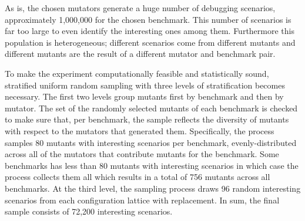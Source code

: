 

As is, the chosen mutators generate a huge number of debugging scenarios,
approximately 1,000,000 for the chosen benchmark. This number of scenarios is
far too large to even identify the interesting ones among them.  Furthermore
this population is heterogeneous; different scenarios come from different
mutants and different mutants are the result of a different mutator and
benchmark pair.

To make the experiment computationally feasible and statistically sound,
stratified uniform random sampling with three levels of stratification becomes
necessary.  The first two levels group mutants first by benchmark and then by
mutator.  The set of the randomly selected mutants of each benchmark is
checked to make sure that, per benchmark, the sample reflects the diversity of
mutants with respect to the mutators that generated them.  Specifically, the
process samples 80 mutants with interesting scenarios per benchmark,
evenly-distributed across all of the mutators that contribute mutants for the
benchmark. Some benchmarks has less than  80 mutants with interesting scenarios
in which case the process collects them all which results in a total of 756 mutants
across all benchmarks.  
At the third level, the sampling process draws 96 random interesting
scenarios from each configuration lattice with replacement. In sum, the
final sample consists of 72,200 interesting scenarios.


